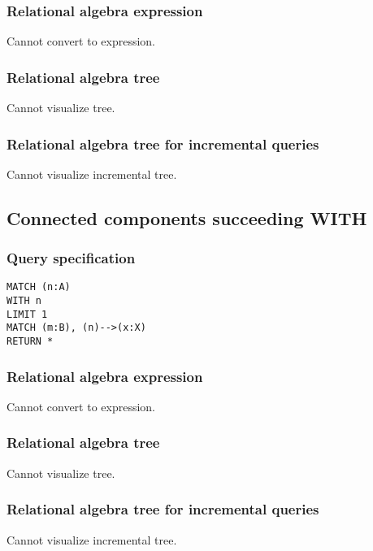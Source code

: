 \subsubsection*{Relational algebra expression}

Cannot convert to expression.

\subsubsection*{Relational algebra tree}

Cannot visualize tree.

\subsubsection*{Relational algebra tree for incremental queries}

Cannot visualize incremental tree.

\subsection{Connected components succeeding WITH}

\subsubsection*{Query specification}

\begin{lstlisting}
MATCH (n:A)
WITH n
LIMIT 1
MATCH (m:B), (n)-->(x:X)
RETURN *
\end{lstlisting}

\subsubsection*{Relational algebra expression}

Cannot convert to expression.

\subsubsection*{Relational algebra tree}

Cannot visualize tree.

\subsubsection*{Relational algebra tree for incremental queries}

Cannot visualize incremental tree.

